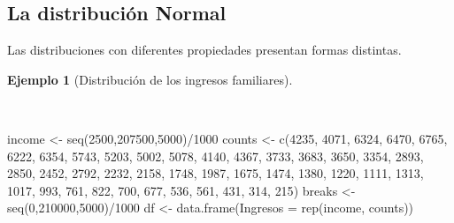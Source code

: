 \documentclass[
  a4paper,
]{scrreport}
\newenvironment{Shaded}{\begin{snugshade}}{\end{snugshade}}
\newcommand{\AttributeTok}[1]{\textcolor[rgb]{0.40,0.45,0.13}{#1}}
\newcommand{\DecValTok}[1]{\textcolor[rgb]{0.68,0.00,0.00}{#1}}
\newcommand{\FunctionTok}[1]{\textcolor[rgb]{0.28,0.35,0.67}{#1}}
\newcommand{\NormalTok}[1]{\textcolor[rgb]{0.00,0.23,0.31}{#1}}
\newcommand{\OtherTok}[1]{\textcolor[rgb]{0.00,0.23,0.31}{#1}}
\newcommand{\SpecialCharTok}[1]{\textcolor[rgb]{0.37,0.37,0.37}{#1}}
\theoremstyle{plain}
\theoremstyle{definition}
\theoremstyle{definition}
\newtheorem{example}{Ejemplo}[chapter]
\theoremstyle{remark}
\begin{document}
\subsection{La distribución Normal}\label{la-distribuciuxf3n-normal}

Las distribuciones con diferentes propiedades presentan formas
distintas.

\begin{example}[Distribución de los ingresos
familiares]\protect\hypertarget{exm-distribucion-ingresos-familiares}{}\label{exm-distribucion-ingresos-familiares}

~

\begin{Shaded}
\begin{Highlighting}[]
\NormalTok{income }\OtherTok{\textless{}{-}} \FunctionTok{seq}\NormalTok{(}\DecValTok{2500}\NormalTok{,}\DecValTok{207500}\NormalTok{,}\DecValTok{5000}\NormalTok{)}\SpecialCharTok{/}\DecValTok{1000}
\NormalTok{counts }\OtherTok{\textless{}{-}} \FunctionTok{c}\NormalTok{(}\DecValTok{4235}\NormalTok{, }\DecValTok{4071}\NormalTok{, }\DecValTok{6324}\NormalTok{, }\DecValTok{6470}\NormalTok{, }\DecValTok{6765}\NormalTok{, }\DecValTok{6222}\NormalTok{, }\DecValTok{6354}\NormalTok{, }\DecValTok{5743}\NormalTok{, }\DecValTok{5203}\NormalTok{, }\DecValTok{5002}\NormalTok{, }\DecValTok{5078}\NormalTok{, }\DecValTok{4140}\NormalTok{, }\DecValTok{4367}\NormalTok{, }\DecValTok{3733}\NormalTok{, }\DecValTok{3683}\NormalTok{, }\DecValTok{3650}\NormalTok{, }\DecValTok{3354}\NormalTok{, }\DecValTok{2893}\NormalTok{, }\DecValTok{2850}\NormalTok{, }\DecValTok{2452}\NormalTok{, }\DecValTok{2792}\NormalTok{, }\DecValTok{2232}\NormalTok{, }\DecValTok{2158}\NormalTok{, }\DecValTok{1748}\NormalTok{, }\DecValTok{1987}\NormalTok{, }\DecValTok{1675}\NormalTok{, }\DecValTok{1474}\NormalTok{, }\DecValTok{1380}\NormalTok{, }\DecValTok{1220}\NormalTok{, }\DecValTok{1111}\NormalTok{, }\DecValTok{1313}\NormalTok{, }\DecValTok{1017}\NormalTok{, }\DecValTok{993}\NormalTok{, }\DecValTok{761}\NormalTok{, }\DecValTok{822}\NormalTok{, }\DecValTok{700}\NormalTok{, }\DecValTok{677}\NormalTok{, }\DecValTok{536}\NormalTok{, }\DecValTok{561}\NormalTok{, }\DecValTok{431}\NormalTok{, }\DecValTok{314}\NormalTok{, }\DecValTok{215}\NormalTok{)}
\NormalTok{breaks }\OtherTok{\textless{}{-}} \FunctionTok{seq}\NormalTok{(}\DecValTok{0}\NormalTok{,}\DecValTok{210000}\NormalTok{,}\DecValTok{5000}\NormalTok{)}\SpecialCharTok{/}\DecValTok{1000}
\NormalTok{df }\OtherTok{\textless{}{-}} \FunctionTok{data.frame}\NormalTok{(}\AttributeTok{Ingresos =} \FunctionTok{rep}\NormalTok{(income, counts))}

\end{Highlighting}
\end{Shaded}
\end{example}
\end{document}
